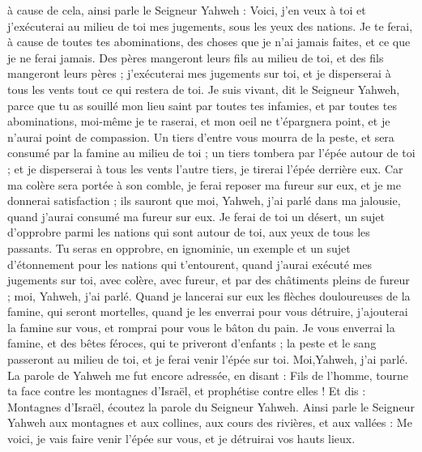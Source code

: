 \begin{multicols}{2}
à cause de cela, ainsi parle le Seigneur Yahweh : Voici, j'en veux à toi et j'exécuterai au milieu de toi mes jugements, sous les yeux des nations.
Je te ferai, à cause de toutes tes abominations, des choses que je n'ai jamais faites, et ce que je ne ferai jamais.
Des pères mangeront leurs fils au milieu de toi, et des fils mangeront leurs pères ; j'exécuterai mes jugements sur toi, et je disperserai à tous les vents tout ce qui restera de toi.
Je suis vivant, dit le Seigneur Yahweh, parce que tu as souillé mon lieu saint par toutes tes infamies, et par toutes tes abominations, moi-même je te raserai, et mon oeil ne t'épargnera point, et je n'aurai point de compassion.
Un tiers d'entre vous mourra de la peste, et sera consumé par la famine au milieu de toi ; un tiers tombera par l'épée autour de toi ; et je disperserai à tous les vents l'autre tiers, je tirerai l'épée derrière eux.
Car ma colère sera portée à son comble, je ferai reposer ma fureur sur eux, et je me donnerai satisfaction ; ils sauront que moi, Yahweh, j'ai parlé dans ma jalousie, quand j'aurai consumé ma fureur sur eux.
Je ferai de toi un désert, un sujet d'opprobre parmi les nations qui sont autour de toi, aux yeux de tous les passants.
Tu seras en opprobre, en ignominie, un exemple et un sujet d'étonnement pour les nations qui t'entourent, quand j'aurai exécuté mes jugements sur toi, avec colère, avec fureur, et par des châtiments pleins de fureur ; moi, Yahweh, j'ai parlé.
Quand je lancerai sur eux les flèches douloureuses de la famine, qui seront mortelles, quand je les enverrai pour vous détruire, j'ajouterai la famine sur vous, et romprai pour vous le bâton du pain.
Je vous enverrai la famine, et des bêtes féroces, qui te priveront d'enfants ; la peste et le sang passeront au milieu de toi, et je ferai venir l'épée sur toi. Moi,Yahweh, j'ai parlé.
\VerseOne{}La parole de Yahweh me fut encore adressée, en disant :
Fils de l'homme, tourne ta face contre les montagnes d'Israël, et prophétise contre elles !
Et dis : Montagnes d'Israël, écoutez la parole du Seigneur Yahweh. Ainsi parle le Seigneur Yahweh aux montagnes et aux collines, aux cours des rivières, et aux vallées : Me voici, je vais faire venir l'épée sur vous, et je détruirai vos hauts lieux.

\end{multicols}
